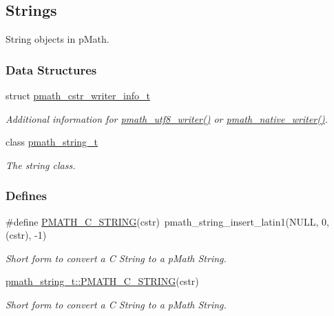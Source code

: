 \hypertarget{group__strings}{
\subsection{Strings}
\label{group__strings}
}
String objects in pMath.  


\subsubsection*{Data Structures}
\begin{CompactItemize}
\item 
struct \hyperlink{structpmath__cstr__writer__info__t}{pmath\_\-cstr\_\-writer\_\-info\_\-t}
\begin{CompactList}\small\item\em Additional information for \hyperlink{group__strings_g5e7a9b1a5eb8861e94dc1bea92c77424}{pmath\_\-utf8\_\-writer()} or \hyperlink{group__strings_ga3ecac6a71274a3e43cedadb10085f2b}{pmath\_\-native\_\-writer()}. \item\end{CompactList}\item 
class \hyperlink{classpmath__string__t}{pmath\_\-string\_\-t}
\begin{CompactList}\small\item\em The string class. \item\end{CompactList}\end{CompactItemize}
\subsubsection*{Defines}
\begin{CompactItemize}
\item 
\#define \hyperlink{group__strings_g0b6ecb1bc5d8aeccbbfaeb72055c7ffc}{PMATH\_\-C\_\-STRING}(cstr)~pmath\_\-string\_\-insert\_\-latin1(NULL, 0, (cstr), -1)
\begin{CompactList}\small\item\em Short form to convert a C String to a pMath String. \item\end{CompactList}\item 
\hyperlink{group__strings_g63b8849d6cfcfa9d73bd404d7a4071c0}{pmath\_\-string\_\-t::PMATH\_\-C\_\-STRING}(cstr)
\begin{CompactList}\small\item\em Short form to convert a C String to a pMath String. \item\end{CompactList}\end{CompactItemize}
